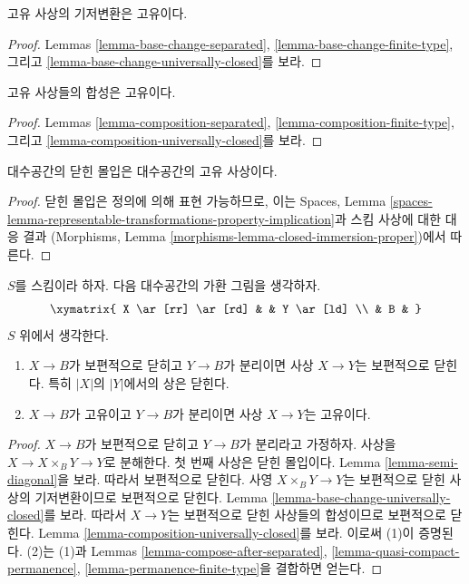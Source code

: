 \begin{lemma}
\label{lemma-base-change-proper}
고유 사상의 기저변환은 고유이다.
\end{lemma}

\begin{proof}
Lemmas \ref{lemma-base-change-separated},
\ref{lemma-base-change-finite-type}, 그리고
\ref{lemma-base-change-universally-closed}를 보라.
\end{proof}

\begin{lemma}
\label{lemma-composition-proper}
고유 사상들의 합성은 고유이다.
\end{lemma}

\begin{proof}
Lemmas \ref{lemma-composition-separated},
\ref{lemma-composition-finite-type}, 그리고
\ref{lemma-composition-universally-closed}를 보라.
\end{proof}

\begin{lemma}
\label{lemma-closed-immersion-proper}
대수공간의 닫힌 몰입은 대수공간의 고유 사상이다.
\end{lemma}

\begin{proof}
닫힌 몰입은 정의에 의해 표현 가능하므로, 이는
Spaces, Lemma
\ref{spaces-lemma-representable-transformations-property-implication}과
스킴 사상에 대한 대응 결과
(Morphisms, Lemma \ref{morphisms-lemma-closed-immersion-proper})에서 따른다.
\end{proof}

\begin{lemma}
\label{lemma-universally-closed-permanence}
$S$를 스킴이라 하자. 다음 대수공간의 가환 그림을 생각하자.
$$
\xymatrix{
X \ar[rr] \ar[rd] & &
Y \ar[ld] \\
& B &
}
$$
$S$ 위에서 생각한다.
\begin{enumerate}
\item $X \to B$가 보편적으로 닫히고 $Y \to B$가 분리이면
사상 $X \to Y$는 보편적으로 닫힌다.
특히 $|X|$의 $|Y|$에서의 상은 닫힌다.
\item $X \to B$가 고유이고 $Y \to B$가 분리이면
사상 $X \to Y$는 고유이다.
\end{enumerate}
\end{lemma}

\begin{proof}
$X \to B$가 보편적으로 닫히고 $Y \to B$가 분리라고 가정하자.
사상을 $X \to X \times_B Y \to Y$로 분해한다.
첫 번째 사상은 닫힌 몰입이다. Lemma \ref{lemma-semi-diagonal}을 보라.
따라서 보편적으로 닫힌다.
사영 $X \times_B Y \to Y$는 보편적으로 닫힌 사상의 기저변환이므로
보편적으로 닫힌다. Lemma \ref{lemma-base-change-universally-closed}를 보라.
따라서 $X \to Y$는 보편적으로 닫힌 사상들의 합성이므로 보편적으로 닫힌다.
Lemma \ref{lemma-composition-universally-closed}를 보라.
이로써 (1)이 증명된다. (2)는 (1)과 Lemmas
\ref{lemma-compose-after-separated}, \ref{lemma-quasi-compact-permanence},
\ref{lemma-permanence-finite-type}을 결합하면 얻는다.
\end{proof}


